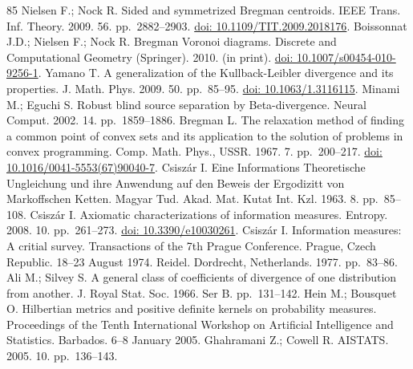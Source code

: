 \begin{thebibliography}{85}
\hypertarget{B12-entropy-12-01532}{} Nielsen F.; Nock R. Sided and symmetrized Bregman centroids. IEEE Trans. Inf. Theory. 2009. 56. pp.~2882--2903. \href{https://doi.org/10.1109/TIT.2009.2018176}{doi: 10.1109/TIT.2009.2018176}.
\hypertarget{B13-entropy-12-01532}{} Boissonnat J.D.; Nielsen F.; Nock R. Bregman Voronoi diagrams. Discrete and Computational Geometry (Springer). 2010. (in print). \href{https://doi.org/10.1007/s00454-010-9256-1}{doi: 10.1007/s00454-010-9256-1}.
\hypertarget{B14-entropy-12-01532}{} Yamano T. A generalization of the Kullback-Leibler divergence and its properties. J. Math. Phys. 2009. 50. pp.~85--95. \href{https://doi.org/10.1063/1.3116115}{doi: 10.1063/1.3116115}.
\hypertarget{B15-entropy-12-01532}{} Minami M.; Eguchi S. Robust blind source separation by Beta-divergence. Neural Comput. 2002. 14. pp.~1859--1886.
\hypertarget{B16-entropy-12-01532}{} Bregman L. The relaxation method of finding a common point of convex sets and its application to the solution of problems in convex programming. Comp. Math. Phys., USSR. 1967. 7. pp.~200--217. \href{https://doi.org/10.1016/0041-5553(67)90040-7}{doi: 10.1016/0041-5553(67)90040-7}.
\hypertarget{B17-entropy-12-01532}{} Csiszár I. Eine Informations Theoretische Ungleichung und ihre Anwendung auf den Beweis der Ergodizitt von Markoffschen Ketten. Magyar Tud. Akad. Mat. Kutat Int. Kzl. 1963. 8. pp.~85--108.
\hypertarget{B18-entropy-12-01532}{} Csiszár I. Axiomatic characterizations of information measures. Entropy. 2008. 10. pp.~261--273. \href{https://doi.org/10.3390/e10030261}{doi: 10.3390/e10030261}.
\hypertarget{B19-entropy-12-01532}{} Csiszár I. Information measures: A critial survey. Transactions of the 7th Prague Conference. Prague, Czech Republic. 18–23 August 1974. Reidel. Dordrecht, Netherlands. 1977. pp.~83--86.
\hypertarget{B20-entropy-12-01532}{} Ali M.; Silvey S. A general class of coefficients of divergence of one distribution from another. J. Royal Stat. Soc. 1966. Ser B. pp.~131--142.
\hypertarget{B21-entropy-12-01532}{} Hein M.; Bousquet O. Hilbertian metrics and positive definite kernels on probability measures. Proceedings of the Tenth International Workshop on Artificial Intelligence and Statistics. Barbados. 6–8 January 2005. Ghahramani Z.; Cowell R. AISTATS. 2005. 10. pp.~136--143.

\end{thebibliography}
